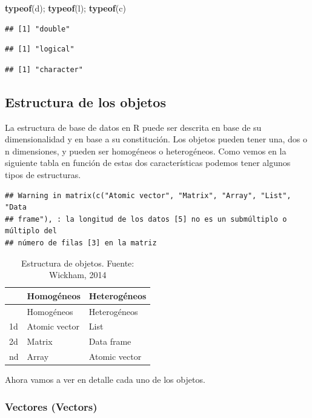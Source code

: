 \documentclass[]{article}
\newenvironment{Shaded}{\begin{snugshade}}{\end{snugshade}}
\newcommand{\KeywordTok}[1]{\textcolor[rgb]{0.13,0.29,0.53}{\textbf{{#1}}}}
\newcommand{\NormalTok}[1]{{#1}}
\begin{document}
\begin{Shaded}
\begin{Highlighting}[]
\KeywordTok{typeof}\NormalTok{(d); }\KeywordTok{typeof}\NormalTok{(l); }\KeywordTok{typeof}\NormalTok{(c)}
\end{Highlighting}
\end{Shaded}

\begin{verbatim}
## [1] "double"
\end{verbatim}

\begin{verbatim}
## [1] "logical"
\end{verbatim}

\begin{verbatim}
## [1] "character"
\end{verbatim}

\subsection{Estructura de los objetos}\label{estructura-de-los-objetos}

La estructura de base de datos en R puede ser descrita en base de su
dimensionalidad y en base a su constitución. Los objetos pueden tener
una, dos o n dimensiones, y pueden ser homogéneos o heterogéneos. Como
vemos en la siguiente tabla en función de estas dos características
podemos tener algunos tipos de estructuras.

\begin{verbatim}
## Warning in matrix(c("Atomic vector", "Matrix", "Array", "List", "Data
## frame"), : la longitud de los datos [5] no es un submúltiplo o múltiplo del
## número de filas [3] en la matriz
\end{verbatim}

\begin{longtable}[]{@{}lll@{}}
\caption{Estructura de objetos. Fuente: Wickham, 2014}\tabularnewline
\toprule
& Homogéneos & Heterogéneos\tabularnewline
\midrule
\endfirsthead
\toprule
& Homogéneos & Heterogéneos\tabularnewline
\midrule
\endhead
1d & Atomic vector & List\tabularnewline
2d & Matrix & Data frame\tabularnewline
nd & Array & Atomic vector\tabularnewline
\bottomrule
\end{longtable}

Ahora vamos a ver en detalle cada uno de los objetos.

\subsubsection{Vectores (Vectors)}\label{vectores-vectors}
\end{document}
